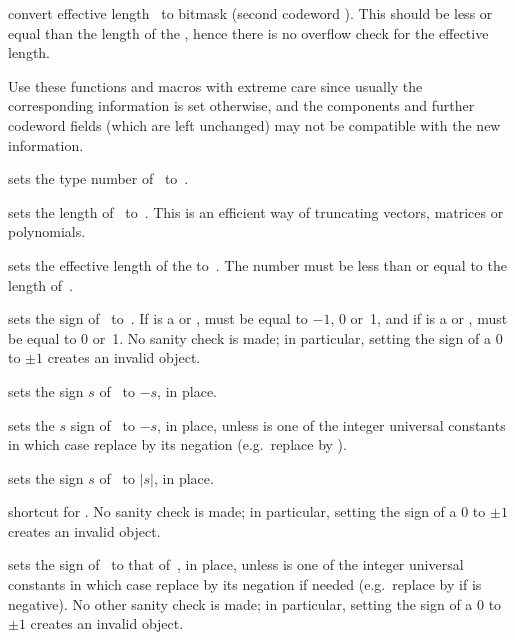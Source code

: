  convert effective length~ to bitmask
(second codeword ). This should be less or equal than the length
of the , hence there is no overflow check for the effective length.

Use these functions and macros with extreme care since usually the
corresponding information is set otherwise, and the components and further
codeword fields (which are left unchanged) may not be compatible with the new
information.

 sets the type number of~ to~.

 sets the length of~ to~. This
is an efficient way of truncating vectors, matrices or polynomials.

 sets the effective length
of the   to~. The number  must be less than or
equal to the length of~.

 sets the sign of~ to~.
If  is a  or ,  must be equal to $-1$, 0
or~1, and if  is a  or ,  must be equal to 0
or~1. No sanity check is made; in particular, setting the sign of a
$0$  to $\pm1$ creates an invalid object.

 sets the sign $s$ of~ to $-s$, in place.

 sets the $s$ sign of~ to $-s$, in
place, unless  is one of the integer universal constants in which case
replace  by its negation (e.g.~replace  by ).

 sets the sign $s$ of~ to $|s|$, in place.

 shortcut for .
No sanity check is made; in particular, setting the sign of a
$0$  to $\pm1$ creates an invalid object.

 sets the sign of~ to that
of~, in place, unless  is one of the integer universal
constants in which case replace  by its negation if needed
(e.g.~replace  by  if  is negative). No other
sanity check is made; in particular, setting the sign of a $0$
 to $\pm1$ creates an invalid object.

